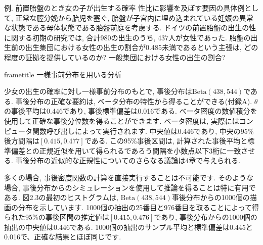 \documentclass[10pt,dvipdfmx,a4]{beamer}
\newcommand{\dbox}[1]{\begin{beamercolorbox}[wd=122mm, sep=0pt, shadow=false, rounded=false]{frametitle} { #1}\end{beamercolorbox}}
\begin{document}
\begin{frame}{例. 前置胎盤のとき女の子が出生する確率}
性比に影響を及ぼす要因の具体例として, 正常な膣分娩から胎児を塞ぐ, 胎盤が子宮内に埋め込まれている妊娠の異常な状態である母体状態である胎盤前庭を考慮する.
ドイツの前置胎盤の出生の性に関する初期の研究では, 合計980の出生のうち, 437人が女性であった.
胎盤の出生前の出生集団における女性の出生の割合が0.485未満であるという主張は, どの程度の証拠を提供しているのか?
一般集団における女性の出生の割合?
\end{frame}


\begin{frame}
\dbox{一様事前分布を用いる分析}
少女の出生の確率に対し一様事前分布のもとで, 事後分布は$\text{Beta}(438,544)$である.
事後分布の正確な要約は, ベータ分布の特性から得ることができる(付録A).
$\theta$の事後平均は0.446であり, 事後標準偏差は0.016である.
ベータ密度の数値積分を使用して正確な事後分位数を得ることができます.
ベータ密度は, 実際にはコンピュータ関数呼び出しによって実行されます.
中央値は0.446であり, 中央の95\%後方間隔は$[0.415,0.477]$である.
この95\%事後区間は, 計算された事後平均と標準偏差との正規近似を用いて得られるであろう間隔を小数点以下3桁に一致させる.
事後分布の近似的な正規性についてのさらなる議論は4章で与えられる.

多くの場合, 事後密度関数の計算を直接実行することは不可能です.
そのような場合, 事後分布からのシミュレーションを使用して推論を得ることは特に有用である.
図2.3の最初のヒストグラムは, $\text{Beta}(438,544)$事後分布からの1000個の描画の分布を示しています.
1000個の抽出の25番目と976番目を取ることによって得られた95\%の事後区間の推定値は$[0.415,0.476]$であり, 事後分布からの1000個の抽出の中央値は0.446である.
1000個の抽出のサンプル平均と標準偏差は0.445と0.016で、正確な結果とほぼ同じです.
\end{frame}

\end{document}

